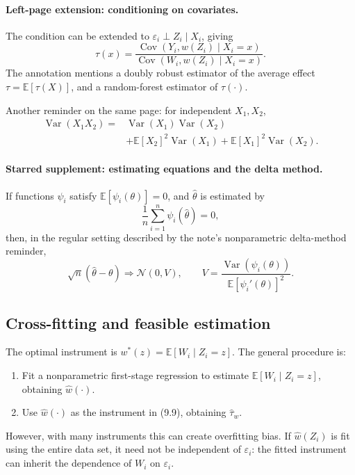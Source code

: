 \paragraph{Left-page extension: conditioning on covariates.}
The condition can be extended to $\varepsilon_i\perp Z_i\mid X_i$, giving
\[
 \tau(x)=\frac{\operatorname{Cov}(Y_i,w(Z_i)\mid X_i=x)}
 {\operatorname{Cov}(W_i,w(Z_i)\mid X_i=x)}.
\]
The annotation mentions a doubly robust estimator of the average effect $\tau=\mathbb E[\tau(X)]$, and a random-forest estimator of $\tau(\cdot)$.

Another reminder on the same page: for independent $X_1,X_2$,
\begin{align*}
 \operatorname{Var}(X_1X_2)
 ={}&\operatorname{Var}(X_1)\operatorname{Var}(X_2)\\
 &+\mathbb E[X_2]^2\operatorname{Var}(X_1)
 +\mathbb E[X_1]^2\operatorname{Var}(X_2).
\end{align*}

\paragraph{Starred supplement: estimating equations and the delta method.}
If functions $\psi_i$ satisfy $\mathbb E[\psi_i(\theta)]=0$, and $\widehat\theta$ is estimated by
\[
 \frac1n\sum_{i=1}^n\psi_i(\widehat\theta)=0,
\]
then, in the regular setting described by the note's nonparametric delta-method reminder,
\[
 \sqrt n(\widehat\theta-\theta)\Rightarrow\mathcal N(0,V),
 \qquad
 V=\frac{\operatorname{Var}(\psi_i(\theta))}
 {\mathbb E[\psi_i'(\theta)]^2}.
\]

\subsection{Cross-fitting and feasible estimation}
The optimal instrument is $w^*(z)=\mathbb E[W_i\mid Z_i=z]$. The general procedure is:
\begin{enumerate}
 \item Fit a nonparametric first-stage regression to estimate $\mathbb E[W_i\mid Z_i=z]$, obtaining $\widehat w(\cdot)$.
 \item Use $\widehat w(\cdot)$ as the instrument in (9.9), obtaining $\widehat\tau_w$.
\end{enumerate}
However, with many instruments this can create overfitting bias. If $\widehat w(Z_i)$ is fit using the entire data set, it need not be independent of $\varepsilon_i$: the fitted instrument can inherit the dependence of $W_i$ on $\varepsilon_i$.

